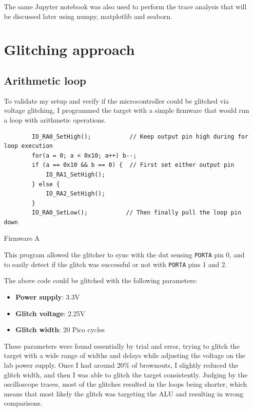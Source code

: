 \documentclass[a4paper,english,twoside,10pt]{article}
\begin{document}
The same Jupyter notebook was also used to perform the trace analysis that will be discussed later using numpy, matplotlib and seaborn.


\section{Glitching approach}\label{sect:approach}
\subsection{Arithmetic loop}\label{sect:arithmeticloop}
To validate my setup and verify if the microcontroller could be glitched via voltage glitching, I programmed the target with a simple firmware that would run a loop with arithmetic operations.
%
\begin{flushleft}
	\captionsetup{type=listing}
	\begin{verbatim}
		IO_RA0_SetHigh();           // Keep output pin high during for loop execution
		for(a = 0; a < 0x10; a++) b--;
		if (a == 0x10 && b == 0) {  // First set either output pin
			IO_RA1_SetHigh();
		} else {
			IO_RA2_SetHigh();
		}
		IO_RA0_SetLow();           // Then finally pull the loop pin down
	\end{verbatim}
	\caption{Firmware A}
\end{flushleft}
%
This program allowed the glitcher to sync with the \gls{dut} sensing \texttt{PORTA} pin 0, and to easily detect if the glitch was successful or not with \texttt{PORTA} pins 1 and 2.

The above code could be glitched with the following parameters:
\begin{itemize}
	\item \textbf{Power supply}: 3.3V
	\item \textbf{Glitch voltage}: 2.25V
	\item \textbf{Glitch width}: 20 Pico cycles
\end{itemize}

These parameters were found essentially by trial and error, trying to glitch the target with a wide range of widths and delays while adjusting the voltage on the lab power supply. Once I had around 20\% of brownouts, I slightly reduced the glitch width, and then I was able to glitch the target consistently.
Judging by the oscilloscope traces, most of the glitches resulted in the loops being shorter, which means that most likely the glitch was targeting the ALU and resulting in wrong comparisons.
\end{document}
